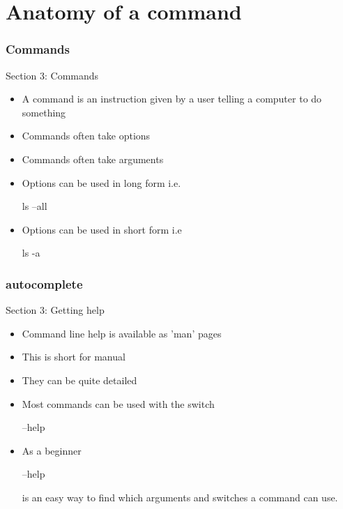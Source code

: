 \part{Anatomy of a command}
\begin{frame}
\partpage
\end{frame}

\section{Commands}
\begin{frame}{Section 3: Commands}
\begin{itemize}
\item A command is an instruction given by a user telling a computer to do something
\item Commands often take options
\item Commands often take arguments
\item Options can be used in long form i.e. \begin{semiverbatim} ls --all \end{semiverbatim}
\item Options can be used in short form i.e \begin{semiverbatim}  ls -a  \end{semiverbatim}
\end{itemize}
\end{frame}


\section{autocomplete}
\begin{frame}{Section 3: Getting help}
\begin{itemize}
\item Command line help is available as 'man' pages
\item This is short for manual
\item They can be quite detailed
\item Most commands can be used with the switch \begin{semiverbatim} --help \end{semiverbatim}
\item As a beginner \begin{semiverbatim}  --help \end{semiverbatim} is an easy way to find which arguments and switches a command can use.
\end{itemize}
\end{frame}

